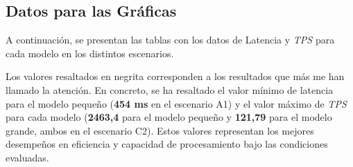 \subsection*{Datos para las Gráficas}
A continuación, se presentan las tablas con los datos de Latencia y \textit{TPS} para cada modelo en los distintos escenarios. 

Los valores resaltados en negrita corresponden a los resultados que más me han llamado la atención. En concreto, se ha resaltado el valor mínimo de latencia para el modelo pequeño (\textbf{454 ms} en el escenario A1) y el valor máximo de \textit{TPS} para cada modelo (\textbf{2463,4} para el modelo pequeño y \textbf{121,79} para el modelo grande, ambos en el escenario C2). Estos valores representan los mejores desempeños en eficiencia y capacidad de procesamiento bajo las condiciones evaluadas.

\begin{table}[H]
\centering
\renewcommand{\arraystretch}{1.2}
\setlength{\tabcolsep}{4pt}
\begin{center}
\end{center}
\caption{Comparativa conjunta de Latencia Promedio y Throughput de \textit{TPS} para ambos modelos en cada escenario.}
\label{tab:latencia_tps_combinada}
\end{table}

